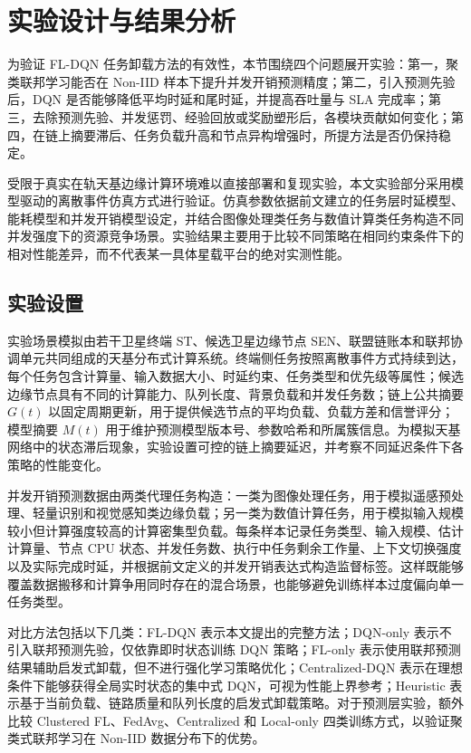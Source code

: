\section{实验设计与结果分析}
\label{sec:ch5_experiments}

为验证 FL-DQN 任务卸载方法的有效性，本节围绕四个问题展开实验：第一，聚类联邦学习能否在 Non-IID 样本下提升并发开销预测精度；第二，引入预测先验后，DQN 是否能够降低平均时延和尾时延，并提高吞吐量与 SLA 完成率；第三，去除预测先验、并发惩罚、经验回放或奖励塑形后，各模块贡献如何变化；第四，在链上摘要滞后、任务负载升高和节点异构增强时，所提方法是否仍保持稳定。

受限于真实在轨天基边缘计算环境难以直接部署和复现实验，本文实验部分采用模型驱动的离散事件仿真方式进行验证。仿真参数依据前文建立的任务层时延模型、能耗模型和并发开销模型设定，并结合图像处理类任务与数值计算类任务构造不同并发强度下的资源竞争场景。实验结果主要用于比较不同策略在相同约束条件下的相对性能差异，而不代表某一具体星载平台的绝对实测性能。

\subsection{实验设置}
\label{subsec:ch5_exp_setup}

实验场景模拟由若干卫星终端 ST、候选卫星边缘节点 SEN、联盟链账本和联邦协调单元共同组成的天基分布式计算系统。终端侧任务按照离散事件方式持续到达，每个任务包含计算量、输入数据大小、时延约束、任务类型和优先级等属性；候选边缘节点具有不同的计算能力、队列长度、背景负载和并发任务数；链上公共摘要 $G(t)$ 以固定周期更新，用于提供候选节点的平均负载、负载方差和信誉评分；模型摘要 $M(t)$ 用于维护预测模型版本号、参数哈希和所属簇信息。为模拟天基网络中的状态滞后现象，实验设置可控的链上摘要延迟，并考察不同延迟条件下各策略的性能变化。

并发开销预测数据由两类代理任务构造：一类为图像处理任务，用于模拟遥感预处理、轻量识别和视觉感知类边缘负载；另一类为数值计算任务，用于模拟输入规模较小但计算强度较高的计算密集型负载。每条样本记录任务类型、输入规模、估计计算量、节点 CPU 状态、并发任务数、执行中任务剩余工作量、上下文切换强度以及实际完成时延，并根据前文定义的并发开销表达式构造监督标签。这样既能够覆盖数据搬移和计算争用同时存在的混合场景，也能够避免训练样本过度偏向单一任务类型。

对比方法包括以下几类：{FL-DQN} 表示本文提出的完整方法；{DQN-only} 表示不引入联邦预测先验，仅依靠即时状态训练 DQN 策略；{FL-only} 表示使用联邦预测结果辅助启发式卸载，但不进行强化学习策略优化；{Centralized-DQN} 表示在理想条件下能够获得全局实时状态的集中式 DQN，可视为性能上界参考；{Heuristic} 表示基于当前负载、链路质量和队列长度的启发式卸载策略。对于预测层实验，额外比较 {Clustered FL}、{FedAvg}、{Centralized} 和 {Local-only} 四类训练方式，以验证聚类式联邦学习在 Non-IID 数据分布下的优势。

